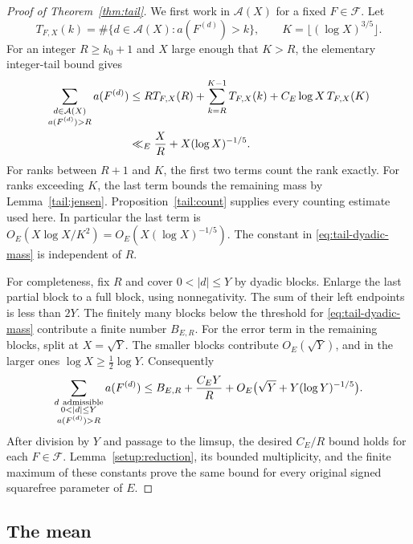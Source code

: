 \begin{proof}[Proof of Theorem~\ref{thm:tail}]
We first work in \(\mathcal A(X)\) for a fixed \(F\in\mathcal F\).
Let
\[
 T_{F,X}(k)=\#\{d\in\mathcal A(X):a(F^{(d)})>k\},
 \qquad K=\lfloor(\log X)^{3/5}\rfloor.
\]
For an integer \(R\ge k_0+1\) and \(X\) large enough that \(K>R\),
the elementary integer-tail bound gives
\begin{align}
 \sum_{\substack{d\in\mathcal A(X)\\a(F^{(d)})>R}}a(F^{(d)})
 &\le R T_{F,X}(R)
       +\sum_{k=R}^{K-1}T_{F,X}(k)
       +C_E\log X\,T_{F,X}(K) \notag\\
 &\ll_E \frac X R+X(\log X)^{-1/5}.
 \label{eq:tail-dyadic-mass}
\end{align}
For ranks between \(R+1\) and \(K\), the first two terms count the rank
exactly. For ranks exceeding \(K\), the last term bounds the remaining
mass by Lemma~\ref{tail:jensen}.
Proposition~\ref{tail:count} supplies every counting estimate used here.
In particular the last term is
\(O_E(X\log X/K^2)=O_E(X(\log X)^{-1/5})\).
The constant in \eqref{eq:tail-dyadic-mass} is independent of \(R\).

For completeness, fix \(R\) and cover \(0<|d|\le Y\) by dyadic blocks.
Enlarge the last partial block to a full block, using nonnegativity.
The sum of their left endpoints is less than \(2Y\).
The finitely many blocks below the threshold for
\eqref{eq:tail-dyadic-mass} contribute a finite number \(B_{E,R}\).
For the error term in the remaining blocks, split at \(X=\sqrt Y\).
The smaller blocks contribute \(O_E(\sqrt Y)\), and in the larger ones
\(\log X\ge\frac12\log Y\).
Consequently
\[
 \sum_{\substack{d\ {\rm admissible}\\0<|d|\le Y\\a(F^{(d)})>R}}
     a(F^{(d)})
 \le B_{E,R}+\frac{C_EY}{R}
       +O_E\bigl(\sqrt Y+Y(\log Y)^{-1/5}\bigr).
\]
After division by \(Y\) and passage to the limsup, the desired
\(C_E/R\) bound holds for each \(F\in\mathcal F\).
Lemma~\ref{setup:reduction}, its bounded multiplicity, and the finite
maximum of these constants prove the same bound for every original
signed squarefree parameter of \(E\).
\end{proof}

\subsection{The mean}


